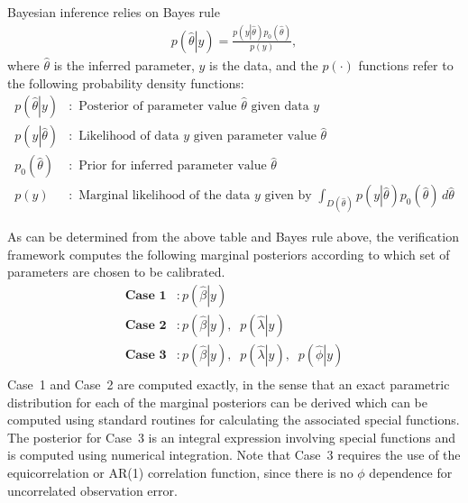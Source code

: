 \documentclass{book}
\begin{document}
\vspace{.1in}
Bayesian inference relies on Bayes rule
\begin{align*}
p\left(\left. \hat \theta \right| y  \right) = \frac{p\left( y \left| \hat \theta \right. \right) p_0\left(\hat \theta\right)} { p\left(y\right)},
\end{align*}
where $\hat \theta$ is the inferred parameter, $y$ is the data, and the $p(\cdot)$ functions refer to
the following probability density functions:
\begin{align*}
p\left(\left. \hat \theta \right| y \right) &: \text{ Posterior of parameter value } \hat \theta \text{ given data } y \\
p\left( y \left| \hat \theta \right. \right) &: \text{ Likelihood of data } y \text{ given parameter value } \hat \theta \\
p_0\left(\hat \theta\right) &: \text{ Prior for inferred parameter value } \hat \theta \\
p\left(y\right) &: \text{ Marginal likelihood of the data } y \text{ given by }
 \int_{D(\hat \theta)} p\left( y \left| \hat \theta \right. \right) p_0\left(\hat \theta\right)\,d\hat\theta
\end{align*}

As can be determined from the above table and Bayes rule above, the verification framework computes the following
marginal posteriors according to which set of parameters are chosen to be calibrated.
\begin{align*}
\textbf{Case 1} &: p\left(\left. \hat \beta \right| y\right)\\
\textbf{Case 2} &: p\left(\left. \hat \beta \right| y\right), \;\; p\left(\left. \hat \lambda \right| y\right) \\
\textbf{Case 3} &: p\left(\left. \hat \beta \right| y\right), \;\; p\left(\left. \hat \lambda \right| y\right), \;\; p\left(\left. \hat \phi \right| y\right) \\
\end{align*}
Case~1 and Case~2 are computed exactly, in the sense that an exact parametric distribution for each of the marginal
posteriors can be derived which can be computed using standard routines for calculating the associated special functions.
The posterior for Case~3 is an integral expression involving special functions and is computed using numerical integration. 
Note that Case~3 requires the use of the equicorrelation or AR(1) correlation function, since there is no $\phi$ dependence
for uncorrelated observation error. 
\end{document}
